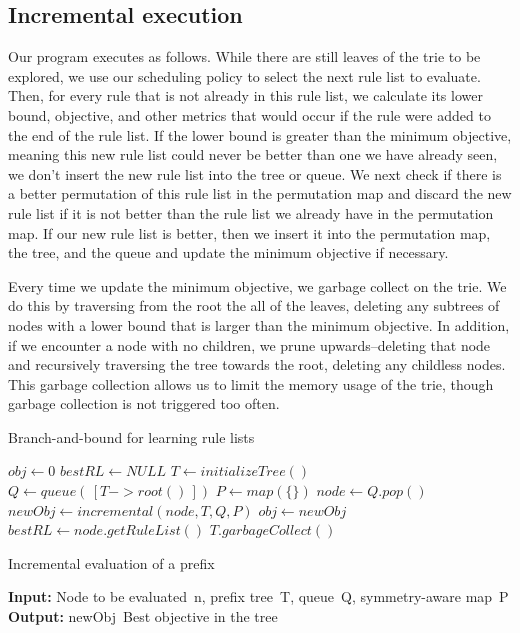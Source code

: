 \documentclass[]{article}
\theoremstyle{definition}
\begin{document}
\subsection{Incremental execution}
Our program executes as follows. 
While there are still leaves of the trie to be explored, we use our scheduling policy to select the next rule list to evaluate.
Then, for every rule that is not already in this rule list, we calculate its lower bound, objective, and other metrics that would occur if the rule were added to the end of the rule list.
If the lower bound is greater than the minimum objective, meaning this new rule list could never be better than one we have already seen, we don't insert the new rule list into the tree or queue.
We next check if there is a better permutation of this rule list in the permutation map and discard the new rule list if it is not better than the rule list we already have in the permutation map.
If our new rule list is better, then we insert it into the permutation map, the tree, and the queue and update the minimum objective if necessary.

Every time we update the minimum objective, we garbage collect on the trie.
We do this by traversing from the root the all of the leaves, deleting any subtrees of nodes with a lower bound that is larger than the minimum objective.
In addition, if we encounter a node with no children, we prune upwards--deleting that node and recursively traversing the tree towards the root, deleting any childless nodes.
This garbage collection allows us to limit the memory usage of the trie, though garbage collection is not triggered too often.

\begin{algorithm}[t!]
  \caption{Branch-and-bound for learning rule lists}
\label{alg:branch-and-bound}
\begin{algorithmic}
\normalsize
\State $obj \gets 0$
\State $bestRL \gets NULL$
\State $T \gets initializeTree()$
\State $Q \gets queue(\,[T->root()\,])$
\State $P \gets map(\{\})$
	\State $node \gets Q.pop()$
	\State $newObj \gets incremental(node, T, Q, P)$ 
		\State $obj \gets newObj$
		\State $bestRL \gets node.getRuleList()$
		\State $T.garbageCollect()$
	\EndIf
\EndWhile


\end{algorithmic}
\end{algorithm}

\begin{algorithm}[t!]
  \caption{Incremental evaluation of a prefix}
\label{alg:incremental}
\begin{algorithmic}
\normalsize
\State \textbf{Input:} Node to be evaluated~n,
prefix tree~T,
queue~Q,
symmetry-aware map~P
\State \textbf{Output:} newObj~Best objective in the tree\\

\State 
\end{algorithmic}
\end{algorithm}
\end{document}
